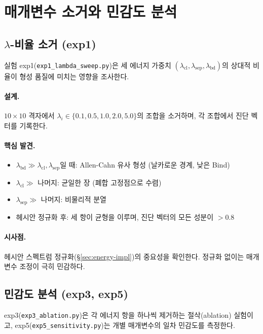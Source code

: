 \section{매개변수 소거와 민감도 분석}
\label{sec:exp-param-sweeps}

\subsection{$\lambda$-비율 소거 (exp1)}

실험 exp1(\texttt{exp1\_lambda\_sweep.py})은 세 에너지 가중치 $(\lambda_{\mathrm{cl}}, \lambda_{\mathrm{sep}}, \lambda_{\mathrm{bd}})$의 상대적 비율이 형성 품질에 미치는 영향을 조사한다.

\paragraph{설계.} $10 \times 10$ 격자에서 $\lambda_i \in \{0.1, 0.5, 1.0, 2.0, 5.0\}$의 조합을 소거하며, 각 조합에서 진단 벡터를 기록한다.

\paragraph{핵심 발견.}
\begin{itemize}
    \item $\lambda_{\mathrm{bd}} \gg \lambda_{\mathrm{cl}}, \lambda_{\mathrm{sep}}$일 때: Allen-Cahn 유사 형성 (날카로운 경계, 낮은 Bind)
    \item $\lambda_{\mathrm{cl}} \gg$ 나머지: 균일한 장 (폐합 고정점으로 수렴)
    \item $\lambda_{\mathrm{sep}} \gg$ 나머지: 비물리적 분열
    \item 헤시안 정규화 후: 세 항이 균형을 이루며, 진단 벡터의 모든 성분이 $> 0.8$
\end{itemize}

\paragraph{시사점.} 헤시안 스펙트럼 정규화(\S\ref{sec:energy-impl})의 중요성을 확인한다. 정규화 없이는 매개변수 조정이 극히 민감하다.

\subsection{민감도 분석 (exp3, exp5)}

exp3(\texttt{exp3\_ablation.py})은 각 에너지 항을 하나씩 제거하는 절삭(ablation) 실험이고, exp5(\texttt{exp5\_sensitivity.py})는 개별 매개변수의 일차 민감도를 측정한다.

